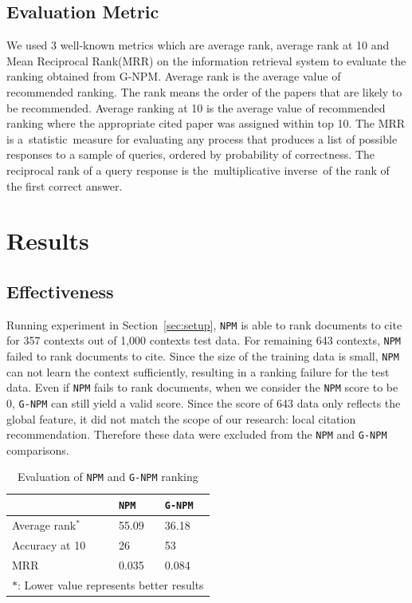 \documentclass{llncs}
\newcommand{\name}{\texttt{G-NPM}\xspace}
\newcommand{\npm}{\texttt{NPM}\xspace}
\begin{document}
\subsection{Evaluation Metric}
\label{sec:metric}
We used 3 well-known metrics which are average rank, average rank at 10 and Mean Reciprocal Rank(MRR) on the information retrieval system to evaluate the ranking obtained from G-NPM. Average rank is the average value of recommended ranking. The rank means the order of the papers that are likely to be recommended. Average ranking at 10 is the average value of recommended ranking where the appropriate cited paper was assigned within top 10. The MRR is a statistic measure for evaluating any process that produces a list of possible responses to a sample of queries, ordered by probability of correctness. The reciprocal rank of a query response is the multiplicative inverse of the rank of the first correct answer.


\section{Results}

\subsection{Effectiveness}
Running experiment in Section~\ref{sec:setup}, \npm is able to rank documents to cite for 357 contexts out of 1,000 contexts test data. For remaining 643 contexts, \npm failed to rank documents to cite. Since the size of the training data is small, \npm can not learn the context sufficiently, resulting in a ranking failure for the test data. Even if \npm fails to rank documents, when we consider the \npm score to be 0, \name can still yield a valid score. Since the score of 643 data only reflects the global feature, it did not match the scope of our research: local citation recommendation. Therefore these data were excluded from the \npm and \name comparisons.

\begin{table}[ht]
\centering
\begin{tabular}{l || p{} | p{}}
\toprule
& \npm & \name \\
\midrule
Average rank$^\ast$ & 55.09 & 36.18 \\
Accuracy at 10 & 26 & 53 \\
MRR & 0.035 & 0.084\\
\midrule
\multicolumn{3}{l}{$\ast$: Lower value represents better results} \\
\bottomrule
\end{tabular}
\caption{Evaluation of \npm and \name ranking}\label{table:rq1}
\vspace{-2em}
\end{table}
\end{document}
